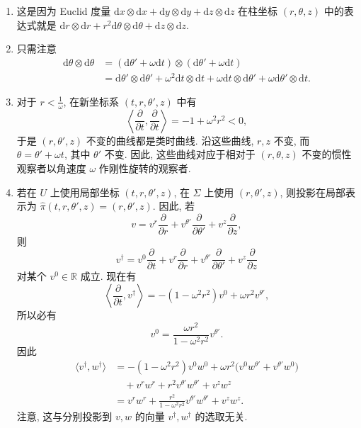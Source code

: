 \begin{description}[font=\normalfont,leftmargin=2em,labelwidth=1.5em]
\begin{enumerate}[label=(\alph*),ref=\alph*,leftmargin=*]
\item 这是因为 Euclid 度量 $\mathrm{d}x\otimes\mathrm{d}x+\mathrm{d}y\otimes\mathrm{d}y+\mathrm{d}z\otimes\mathrm{d}z$ 在柱坐标 $(r,\theta,z)$ 中的表达式就是 $\mathrm{d}r\otimes\mathrm{d}r+r^2\mathrm{d}\theta\otimes\mathrm{d}\theta+\mathrm{d}z\otimes\mathrm{d}z$.
\item 只需注意
\begin{align*}
  \mathrm{d}\theta\otimes\mathrm{d}\theta
    &=(\mathrm{d}\theta'+\omega\mathrm{d}t)\otimes(\mathrm{d}\theta'+\omega\mathrm{d}t)\\
    &=\mathrm{d}\theta'\otimes\mathrm{d}\theta'+\omega^2\mathrm{d}t\otimes\mathrm{d}t
       +\omega\mathrm{d}t\otimes\mathrm{d}\theta'+\omega\mathrm{d}\theta'\otimes\mathrm{d}t.
\end{align*}
\item 对于 $r<\frac{1}{\omega}$, 在新坐标系 $(t,r,\theta',z)$ 中有
\[
  \left\langle\frac{\partial}{\partial t},\frac{\partial}{\partial t}\right\rangle
  =-1+\omega^2r^2<0,
\]
于是 $(r,\theta',z)$ 不变的曲线都是类时曲线. 沿这些曲线, $r,z$ 不变, 而 $\theta=\theta'+\omega t$, 其中 $\theta'$ 不变. 因此, 这些曲线对应于相对于 $(r,\theta,z)$ 不变的惯性观察者以角速度 $\omega$ 作刚性旋转的观察者.
\item 若在 $U$ 上使用局部坐标 $(t,r,\theta',z)$, 在 $\Sigma$ 上使用 $(r,\theta',z)$, 则投影在局部表示为 $\widehat{\pi}(t,r,\theta',z)=(r,\theta',z)$. 因此, 若
\[
  v=v^r\frac{\partial}{\partial r}+v^{\theta'}\frac{\partial}{\partial\theta'}
    +v^z\frac{\partial}{\partial z},
\]
则
\[
  v^\dagger=v^0\frac{\partial}{\partial t}+v^r\frac{\partial}{\partial r}
    +v^{\theta'}\frac{\partial}{\partial\theta'}+v^z\frac{\partial}{\partial z}
\]
对某个 $v^0\in\mathbb{R}$ 成立. 现在有
\[
  \left\langle\frac{\partial}{\partial t},v^\dagger\right\rangle
  =-(1-\omega^2r^2)v^0+\omega r^2v^{\theta'},
\]
所以必有
\[
  v^0=\frac{\omega r^2}{1-\omega^2r^2}v^{\theta'}.
\]
因此
\begin{align*}
  \langle v^\dagger,w^\dagger\rangle
     &=-(1-\omega^2r^2)v^0w^0+\omega r^2\bigl(v^0w^{\theta'}+v^{\theta'}w^0\bigr)\\
     &\quad+v^rw^r+r^2v^{\theta'}w^{\theta'}+v^zw^z\\
     &=v^rw^r+\frac{r^2}{1-\omega^2r^2}v^{\theta'}w^{\theta'}+v^zw^z.
\end{align*}
注意, 这与分别投影到 $v,w$ 的向量 $v^\dagger,w^\dagger$ 的选取无关.

\end{enumerate}
\end{description}
